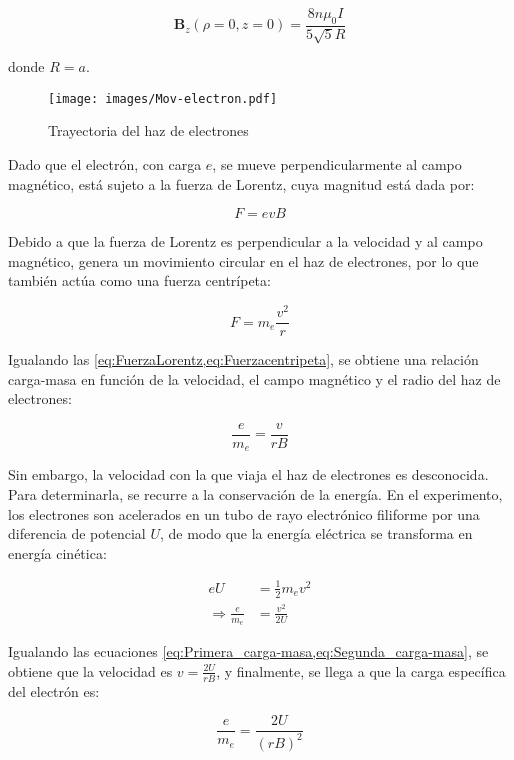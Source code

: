 \begin{equation}
    \mathbf{B}_{z}(\rho=0, z=0) = \frac{8 n \mu_{0} I}{5 \sqrt{5} R}
    \label{eq:Campo_magnetico_enHaz}
\end{equation}

donde \( R = a \).

\begin{figure}[H]
    \centering
    \texttt{[image: images/Mov-electron.pdf]}
    \caption{Trayectoria del haz de electrones}
    \label{fig:haz_elelctrones}
\end{figure}

Dado que el electrón, con carga \( e \), se mueve perpendicularmente al campo magnético, está sujeto a la fuerza de Lorentz, cuya magnitud está dada por:

\begin{equation}
    F = e v B
    \label{eq:FuerzaLorentz}
\end{equation}

Debido a que la fuerza de Lorentz es perpendicular a la velocidad y al campo magnético, genera un movimiento circular en el haz de electrones, por lo que también actúa como una fuerza centrípeta:

\begin{equation}
    F = m_{e} \frac{v^{2}}{r}
    \label{eq:Fuerzacentripeta}
\end{equation}

Igualando las \cref{eq:FuerzaLorentz,eq:Fuerzacentripeta}, se obtiene una relación carga-masa en función de la velocidad, el campo magnético y el radio del haz de electrones:

\begin{equation}
    \frac{e}{m_{e}} = \frac{v}{r B}
    \label{eq:Primera_carga-masa}
\end{equation}

Sin embargo, la velocidad con la que viaja el haz de electrones es desconocida. Para determinarla, se recurre a la conservación de la energía. En el experimento, los electrones son acelerados en un tubo de rayo electrónico filiforme por una diferencia de potencial \( U \), de modo que la energía eléctrica se transforma en energía cinética:

\begin{equation}
\begin{aligned}
    e U &= \frac{1}{2} m_{e} v^{2} \\
    \Rightarrow \frac{e}{m_{e}} &= \frac{v^{2}}{2 U}
\end{aligned}
\label{eq:Segunda_carga-masa}
\end{equation}

Igualando las ecuaciones \cref{eq:Primera_carga-masa,eq:Segunda_carga-masa}, se obtiene que la velocidad es \( v = \frac{2 U}{r B} \), y finalmente, se llega a que la carga específica del electrón es: \cite{leybold_experimentos}

\begin{equation}
    \frac{e}{m_{e}} = \frac{2 U}{(r B)^{2}}
    \label{eq:carga-masa}
\end{equation}







